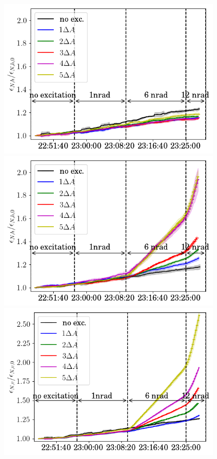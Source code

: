 \documentclass[%
 reprint,
 amsmath,amssymb,
 aps,
prstab,
]{revtex4-1}
\begin{document}
\begin{figure}[b]
\begin{minipage}[t]{0.49\linewidth}
		\includegraphics[width=1.0\linewidth]{2017_emith_avg_rel_vran_no_damper.png}
	\end{minipage}	
	\begin{minipage}[t]{0.49\linewidth}
		\centering
		\includegraphics[width=1.0\linewidth]{2017_emith_avg_rel_hvran_no_damper.png}
	\end{minipage}	
	\begin{minipage}[t]{0.49\linewidth}
		\centering
		\includegraphics[width=1.0\linewidth]{2017_emitv_avg_rel_vran_no_damper.png}

\end{minipage}
\end{figure}
\end{document}
